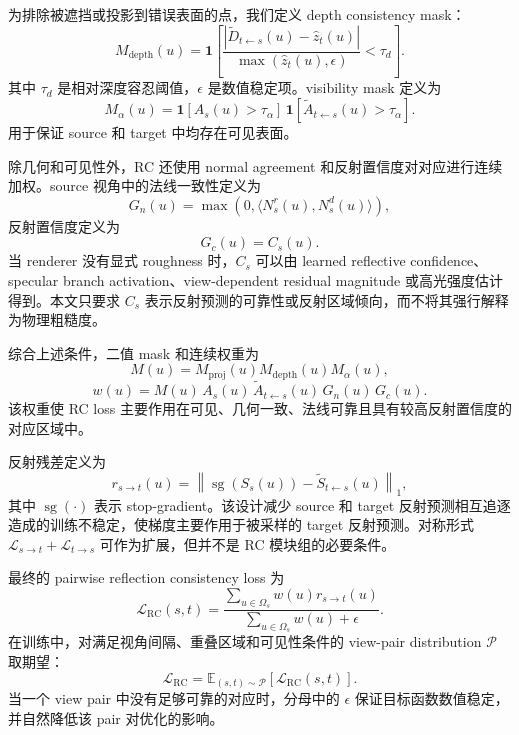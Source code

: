 \documentclass[UTF8,a4paper,11pt]{ctexart}
\newcommand{\Ind}[1]{\mathbf{1}\!\left[#1\right]}
\begin{document}
为排除被遮挡或投影到错误表面的点，我们定义 depth consistency mask：
\begin{equation}
M_{\mathrm{depth}}(u)=
\Ind{
\frac{|\tilde{D}_{t\leftarrow s}(u)-\hat{z}_t(u)|}
{\max(\hat{z}_t(u),\epsilon)}
<\tau_d
}.
\end{equation}
其中 \(\tau_d\) 是相对深度容忍阈值，\(\epsilon\) 是数值稳定项。visibility mask 定义为
\begin{equation}
M_{\alpha}(u)=
\Ind{A_s(u)>\tau_\alpha}\,
\Ind{\tilde{A}_{t\leftarrow s}(u)>\tau_\alpha}.
\end{equation}
用于保证 source 和 target 中均存在可见表面。

除几何和可见性外，RC 还使用 normal agreement 和反射置信度对对应进行连续加权。source 视角中的法线一致性定义为
\begin{equation}
G_n(u)=
\max(0,\langle N_s^r(u),N_s^d(u)\rangle),
\end{equation}
反射置信度定义为
\begin{equation}
G_c(u)=C_s(u).
\end{equation}
当 renderer 没有显式 roughness 时，\(C_s\) 可以由 learned reflective confidence、specular branch activation、view-dependent residual magnitude 或高光强度估计得到。本文只要求 \(C_s\) 表示反射预测的可靠性或反射区域倾向，而不将其强行解释为物理粗糙度。

综合上述条件，二值 mask 和连续权重为
\begin{equation}
M(u)=M_{\mathrm{proj}}(u)
M_{\mathrm{depth}}(u)
M_{\alpha}(u),
\end{equation}
\begin{equation}
w(u)=
M(u)\,
A_s(u)\,
\tilde{A}_{t\leftarrow s}(u)\,
G_n(u)\,
G_c(u).
\end{equation}
该权重使 RC loss 主要作用在可见、几何一致、法线可靠且具有较高反射置信度的对应区域中。

反射残差定义为
\begin{equation}
r_{s\rightarrow t}(u)=
\left\|
\operatorname{sg}(S_s(u))-
\tilde{S}_{t\leftarrow s}(u)
\right\|_1,
\end{equation}
其中 \(\operatorname{sg}(\cdot)\) 表示 stop-gradient。该设计减少 source 和 target 反射预测相互追逐造成的训练不稳定，使梯度主要作用于被采样的 target 反射预测。对称形式 \(\mathcal{L}_{s\rightarrow t}+\mathcal{L}_{t\rightarrow s}\) 可作为扩展，但并不是 RC 模块组的必要条件。

最终的 pairwise reflection consistency loss 为
\begin{equation}
\mathcal{L}_{\mathrm{RC}}(s,t)=
\frac{\sum_{u\in\Omega_s}w(u)r_{s\rightarrow t}(u)}
{\sum_{u\in\Omega_s}w(u)+\epsilon}.
\end{equation}
在训练中，对满足视角间隔、重叠区域和可见性条件的 view-pair distribution \(\mathcal{P}\) 取期望：
\begin{equation}
\mathcal{L}_{\mathrm{RC}}=
\mathbb{E}_{(s,t)\sim\mathcal{P}}
\left[
\mathcal{L}_{\mathrm{RC}}(s,t)
\right].
\end{equation}
当一个 view pair 中没有足够可靠的对应时，分母中的 \(\epsilon\) 保证目标函数数值稳定，并自然降低该 pair 对优化的影响。
\end{document}
